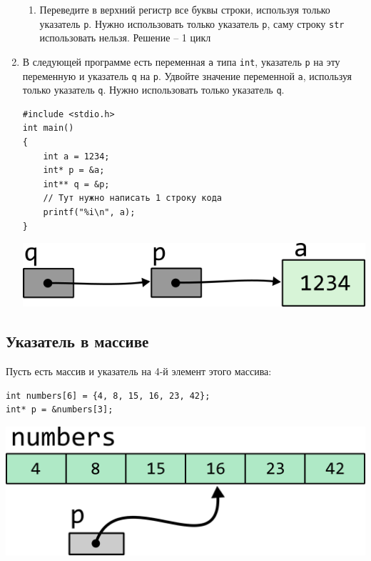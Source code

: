 \documentclass{article}
\begin{document}
\begin{enumerate}
\begin{enumerate}
\item Переведите в верхний регистр все буквы строки, используя только указатель \texttt{p}. Нужно использовать только указатель \texttt{p}, саму строку \texttt{str} использовать нельзя. Решение -- 1 цикл
\end{enumerate}


\item В следующей программе есть переменная \texttt{a} типа \texttt{int}, указатель \texttt{p} на эту переменную и указатель \texttt{q} на \texttt{p}. Удвойте значение переменной \texttt{a}, используя только указатель \texttt{q}. Нужно использовать только указатель \texttt{q}.
\begin{multicols}{2}
\begin{lstlisting}
#include <stdio.h>
int main() 
{
    int a = 1234;
    int* p = &a;
    int** q = &p;
    // Тут нужно написать 1 строку кода
    printf("%i\n", a);
}
\end{lstlisting}

\vfill \null    
\columnbreak
\vfill \null 

\begin{center}
\includegraphics[scale=1]{../images/pointer_schemes/pointer_to_pointer_to_int.png}
\end{center}
\end{multicols}

\end{enumerate}











\newpage
\subsection{Указатель в массиве}
Пусть есть массив и указатель на 4-й элемент этого массива:
\begin{lstlisting}
int numbers[6] = {4, 8, 15, 16, 23, 42};
int* p = &numbers[3];
\end{lstlisting}

\begin{center}
\includegraphics[scale=0.7]{../images/pointer_task_arithmetics.png}
\end{center}
\end{document}
